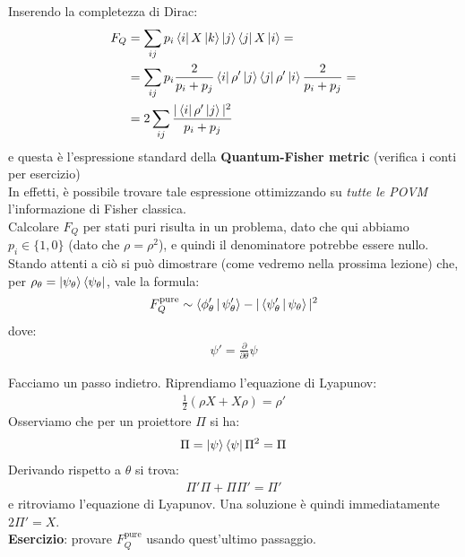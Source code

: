 \documentclass[../../InformazioneQuantistica.tex]{subfiles}
\begin{document}
Inserendo la completezza di Dirac:
\begin{align*}
F_Q &= \sum_{ij} p_i \Bra{i}X\Ket{k}\Ket{j}\Bra{j}X \Ket{i} =\\
&= \sum_{ij} p_i \frac{2}{p_i + p_j} \Bra{i} \rho' \Ket{j}\Bra{j}\rho'\Ket{i} \frac{2}{p_i + p_j} =\\
&= 2 \sum_{ij} \frac{|\Bra{i} \rho' \Ket{j}|^2}{p_i + p_j}
\end{align*}
e questa è l'espressione standard della \textbf{Quantum-Fisher metric} (verifica i conti per esercizio)\\
In effetti, è possibile trovare tale espressione ottimizzando su \textit{tutte le POVM} l'informazione di Fisher classica.\\

Calcolare $F_Q$ per stati puri risulta in un problema, dato che qui abbiamo $p_i \in \{1,0\}$ (dato che $\rho=\rho^2$), e quindi il denominatore potrebbe essere nullo.\\
Stando attenti a ciò si può dimostrare (come vedremo nella prossima lezione) che, per $\rho_\theta = \Ket{\psi_\theta}\Bra{\psi_\theta}$, vale la formula:
\begin{align*}
F_Q^{\mathrm{pure}} \sim \Braket{\phi'_\theta|\psi'_\theta} - |\Braket{\psi'_\theta|\psi_\theta}|^2
\end{align*}
dove:
\begin{align*}
\psi' = \frac{\partial}{\partial \theta}\psi
\end{align*}

Facciamo un passo indietro. Riprendiamo l'equazione di Lyapunov:
\begin{align*}
\frac{1}{2}(\rho X + X\rho) = \rho'
\end{align*}
Osserviamo che per un proiettore $\Pi$ si ha:
\begin{align*}
\Pi = \Ket{\psi}\Bra{\psi} \Pi^2 = \Pi 
\end{align*}
Derivando rispetto a $\theta$ si trova:
\begin{align*}
\Pi'\Pi + \Pi \Pi' = \Pi'
\end{align*}
e ritroviamo l'equazione di Lyapunov. Una soluzione è quindi immediatamente $2\Pi' = X$.\\
\textbf{Esercizio}: provare $F_Q^{\mathrm{pure}}$ usando quest'ultimo passaggio. 
\end{document}
